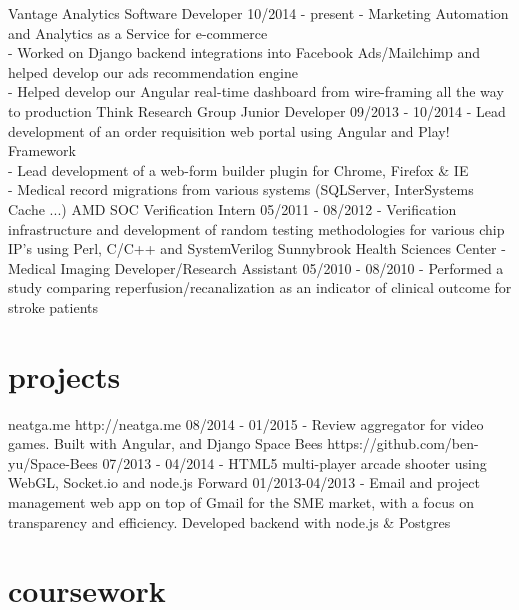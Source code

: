 \documentclass[]{friggeri-cv}
\begin{document}
\begin{entrylist}
  \entry
    {Vantage Analytics}
    {Software Developer}
    {10/2014 - present}
    {- Marketing Automation and Analytics as a Service for e-commerce\\
     - Worked on Django backend integrations into Facebook Ads/Mailchimp and helped develop our ads recommendation engine\\
     - Helped develop our Angular real-time dashboard from wire-framing all the way to production}
  \entry
    {Think Research Group}
    {Junior Developer}
    {09/2013 - 10/2014}
    {- Lead development of an order requisition web portal using Angular and Play! Framework\\
     - Lead development of a web-form builder plugin for Chrome, Firefox \& IE\\
     - Medical record migrations from various systems (SQLServer, InterSystems Cache ...)}
  \entry
    {AMD}
    {SOC Verification Intern}
    {05/2011 - 08/2012}
    {- Verification infrastructure and development of random testing methodologies for various chip IP’s using Perl, C/C++ and SystemVerilog}
  \entry
    {Sunnybrook Health Sciences Center - Medical Imaging}
    {Developer/Research Assistant}
    {05/2010 - 08/2010}
    {- Performed a study comparing reperfusion/recanalization as an indicator of clinical outcome for stroke patients}
\end{entrylist}

\section{projects}

\begin{entrylist}
  \entry
    {neatga.me}
    {http://neatga.me}
    {08/2014 - 01/2015}
    {- Review aggregator for video games. Built with Angular, and Django}
  \entry
    {Space Bees}
    {https://github.com/ben-yu/Space-Bees}
    {07/2013 - 04/2014}
    {- HTML5 multi-player arcade shooter using WebGL, Socket.io and node.js}
  \entry
    {Forward}
    {}
    {01/2013-04/2013}
    {- Email and project management web app on top of Gmail for the SME market, with a focus on transparency and efficiency. Developed backend with node.js \& Postgres}
\end{entrylist}

\section{coursework}
\end{document}
